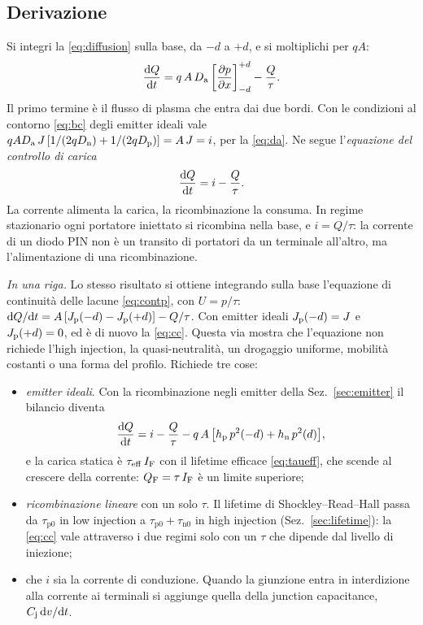 \documentclass[10pt,a4paper]{scrartcl}
\let\newcommand\pdvaluedefine
\newcommand{\IF}{I_\mathrm{F}}
\newcommand{\Cj}{C_\mathrm{j}}
\newcommand{\diff}{\mathrm{d}}
\newcommand{\Da}{D_\mathrm{a}}
\newcommand{\Dn}{D_\mathrm{n}}
\newcommand{\Dp}{D_\mathrm{p}}
\newcommand{\Jp}{J_\mathrm{p}}
\newcommand{\QF}{Q_\mathrm{F}}
\newcommand{\dpar}[2]{\frac{\partial #1}{\partial #2}}
\begin{document}
\subsection{Derivazione}
\label{sec:ccderiv}
Si integri la \eqref{eq:diffusion} sulla base, da $-d$ a $+d$, e si moltiplichi per $qA$:
\begin{equation}
\frac{\diff Q}{\diff t} = q\,A\,\Da\left[\dpar{p}{x}\right]_{-d}^{+d} - \frac{Q}{\tau} .
\label{eq:integrated}
\end{equation}
Il primo termine è il flusso di plasma che entra dai due bordi. Con le condizioni al contorno \eqref{eq:bc} degli emitter ideali vale $q A \Da\,J\,[1/(2q\Dn) + 1/(2q\Dp)] = A\,J = i$, per la \eqref{eq:da}. Ne segue l'\emph{equazione del controllo di carica}
\begin{equation}
\frac{\diff Q}{\diff t} = i - \frac{Q}{\tau} .
\label{eq:cc}
\end{equation}
La corrente alimenta la carica, la ricombinazione la consuma. In regime stazionario ogni portatore iniettato si ricombina nella base, e $i = Q/\tau$: la corrente di un diodo PIN non è un transito di portatori da un terminale all'altro, ma l'alimentazione di una ricombinazione.

\emph{In una riga.} Lo stesso risultato si ottiene integrando sulla base l'equazione di continuità delle lacune \eqref{eq:contp}, con $U = p/\tau$: $\diff Q/\diff t = A\,[\Jp(-d) - \Jp(+d)] - Q/\tau$. Con emitter ideali $\Jp(-d) = J$ e $\Jp(+d) = 0$, ed è di nuovo la \eqref{eq:cc}. Questa via mostra che l'equazione non richiede l'high injection, la quasi-neutralità, un drogaggio uniforme, mobilità costanti o una forma del profilo. Richiede tre cose:
\begin{itemize}
\item \emph{emitter ideali}. Con la ricombinazione negli emitter della Sez.~\ref{sec:emitter} il bilancio diventa
\begin{equation}
\frac{\diff Q}{\diff t} = i - \frac{Q}{\tau} - q\,A\,\bigl[h_\mathrm{p}\,p^2(-d) + h_\mathrm{n}\,p^2(d)\bigr] ,
\label{eq:ccem}
\end{equation}
e la carica statica è $\tau_\mathrm{eff}\,\IF$ con il lifetime efficace \eqref{eq:taueff}, che scende al crescere della corrente: $\QF = \tau\,\IF$ è un limite superiore;
\item \emph{ricombinazione lineare} con un solo $\tau$. Il lifetime di Shockley--Read--Hall passa da $\tau_\mathrm{p0}$ in low injection a $\tau_\mathrm{p0} + \tau_\mathrm{n0}$ in high injection (Sez.~\ref{sec:lifetime}): la \eqref{eq:cc} vale attraverso i due regimi solo con un $\tau$ che dipende dal livello di iniezione;
\item che $i$ sia la corrente di conduzione. Quando la giunzione entra in interdizione alla corrente ai terminali si aggiunge quella della junction capacitance, $\Cj\,\diff v/\diff t$.
\end{itemize}
\end{document}
